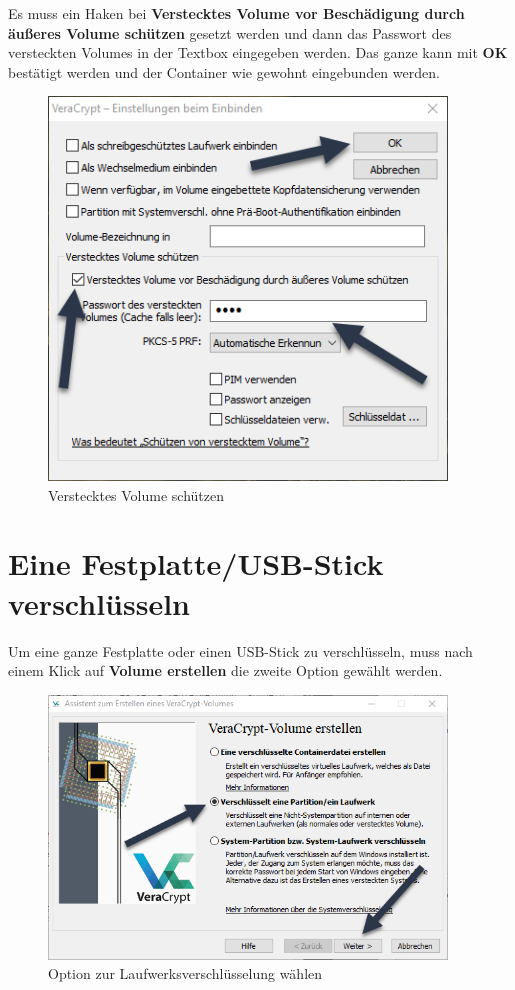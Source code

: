 \documentclass[12pt,a4paper]{scrreprt}
\begin{document}
\newpage

\noindent Es muss ein Haken bei \textbf{Verstecktes Volume vor Beschädigung durch äußeres Volume schützen} gesetzt werden und dann das Passwort des versteckten Volumes in der Textbox eingegeben werden. Das ganze kann mit \textbf{OK} bestätigt werden und der Container wie gewohnt eingebunden werden.

\begin{figure}[h]
\begin{center}
\includegraphics[width=300pt]{media/protecthidden.png}
\caption{Verstecktes Volume schützen}
\label{protecthidden}
\end{center}
\end{figure}

\newpage

\section{Eine Festplatte/USB-Stick verschlüsseln}
Um eine ganze Festplatte oder einen USB-Stick zu verschlüsseln, muss nach einem Klick auf \textbf{Volume erstellen} die zweite Option gewählt werden.

\begin{figure}[h]
\begin{center}
\includegraphics[width=300pt]{media/selectdeviceoption.png}
\caption{Option zur Laufwerksverschlüsselung wählen}
\label{selectdeviceoption}
\end{center}
\end{figure}
\end{document}
